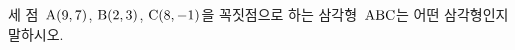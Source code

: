 세 점~$\mathrm{A}(9{,}\mkern3mu\mathopen{}7)$, $\mathrm{B}(2{,}\mkern3mu\mathopen{}3)$, $\mathrm{C}(8{,}\mkern3mu\mathopen{}-1)$을 꼭짓점으로 하는 삼각형~$\mathrm{ABC}$는 어떤 삼각형인지 말하시오.
